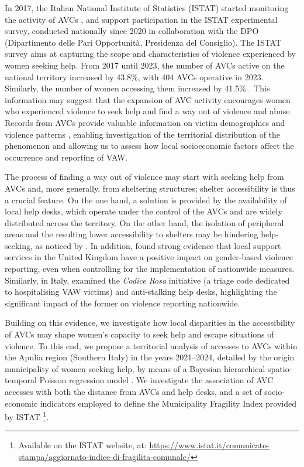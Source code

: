 \documentclass[openany, 11pt, oneside]{book}
\begin{document}
In 2017, the Italian National Institute of Statistics (ISTAT) started monitoring the activity of AVCs \parencite{ISTAT2023}, and support participation in the ISTAT experimental survey, conducted nationally since 2020 in collaboration with the DPO (Dipartimento delle Pari Opportunit\`{a}, Presidenza del Consiglio). The ISTAT survey aims at capturing the scope and characteristics of violence experienced by women seeking help. From 2017 until 2023, the number of AVCs active on the national territory increased by 43.8\%, with 404 AVCs operative in 2023. Similarly, the number of women accessing them increased by 41.5\% \parencite{ISTAT2023}. This information may suggest that the expansion of AVC activity encourages women who experienced violence to seek help and find a way out of violence and abuse.
%
Records from AVCs provide valuable information on victim demographics and violence patterns \parencite{Toffanin2020}, enabling investigation of the territorial distribution of the phenomenon and allowing us to assess how local socioeconomic factors affect the occurrence and reporting of VAW.

The process of finding a way out of violence may start with seeking help from AVCs \parencite{CAV2024report} and, more generally, from sheltering structures; shelter accessibility is thus a crucial feature. On the one hand, a solution is provided by the availability of local help desks, which operate under the control of the AVCs and are widely distributed across the territory. On the other hand, the isolation of peripheral areas and the resulting lower accessibility to shelters may be hindering help-seeking, as noticed by \cite{peek2011rural}. In addition, \cite{Denti2022} found strong evidence that local support services in the United Kingdom have a positive impact on gender-based violence reporting, even when controlling for the implementation of nationwide measures. Similarly, in Italy, \cite{Bettin} examined the \textit{Codice Rosa} initiative (a triage code dedicated to hospitalising VAW victims) and anti-stalking help desks, highlighting the significant impact of the former on violence reporting nationwide.

Building on this evidence, we investigate how local disparities in the accessibility of AVCs may shape women’s capacity to seek help and escape situations of violence.
%
To this end, we propose a territorial analysis of accesses to AVCs within the Apulia region (Southern Italy) in the years 2021--2024, detailed by the origin municipality of women seeking help, by means of a Bayesian hierarchical spatio-temporal Poisson regression model \parencite{martinez2008autoregressive}. We investigate the association of AVC accesses with both the distance from AVCs and help desks, and a set of socio-economic indicators employed to define the Municipality Fragility Index provided by ISTAT \footnote{\label{note:MFI} Available on the ISTAT website, at: \url{https://www.istat.it/comunicato-stampa/aggiornato-indice-di-fragilita-comunale/}}.
\end{document}
